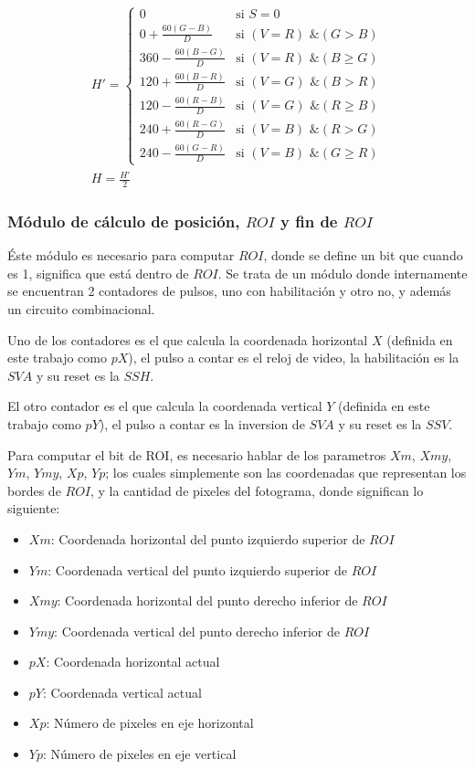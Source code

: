 \documentclass[twoside,spanish,ESP,MSc]{plantillaLabUPV}
\theoremstyle{definition}
\begin{document}
\begin{equation}\label{eqhent}
\begin{gathered}
{ H' = \left \{ \begin{matrix}
	0 & \mbox {si } S=0 \\ 
	0 + \frac{60(G-B)}{D}			& \mbox{si }(V=R) \mbox{ \& } (G > B) \\
	360 - \frac{60(B-G)}{D}			& \mbox{si }(V=R) \mbox{ \& } (B \geq G) \\
	120 + \frac{60(B-R)}{D}			& \mbox{si }(V=G) \mbox{ \& } (B > R) \\
	120 - \frac{60(R-B)}{D}			& \mbox{si }(V=G) \mbox{ \& } (R \geq B) \\
	240 + \frac{60(R-G)}{D}			& \mbox{si }(V=B) \mbox{ \& } (R > G) \\
	240 - \frac{60(G-R)}{D}			& \mbox{si }(V=B) \mbox{ \& } (G \geq R) 
	\end{matrix}\right. } \\
	H = \frac{H'}{2}
\end{gathered}
\end{equation}

\subsubsection{Módulo de cálculo de posición, $ROI$ y fin de $ROI$}
Éste módulo es necesario para computar $ROI$, donde se define un bit que cuando es 1, significa que está dentro de $ROI$. Se trata de un módulo donde internamente se encuentran 2 contadores de pulsos, uno con habilitación y otro no, y además un circuito combinacional.

Uno de los contadores es el que calcula la coordenada horizontal $X$ (definida en este trabajo como $pX$), el pulso a contar es el reloj de video, la habilitación es la $SVA$ y su reset es la $SSH$.

El otro contador es el que calcula la coordenada vertical $Y$ (definida en este trabajo como $pY$), el pulso a contar es la inversion de $SVA$ y su reset es la $SSV$.

Para computar el bit de ROI, es necesario hablar de los parametros $Xm$, $Xmy$, $Ym$, $Ymy$, $Xp$, $Yp$;  los cuales simplemente son las coordenadas que representan los bordes de $ROI$, y la cantidad de pixeles del fotograma, donde significan lo siguiente:

\begin{itemize}[noitemsep]
\item $Xm$: Coordenada horizontal del punto izquierdo superior de $ROI$
\item $Ym$: Coordenada vertical del punto izquierdo superior de $ROI$
\item $Xmy$: Coordenada horizontal del punto derecho inferior de $ROI$
\item $Ymy$: Coordenada vertical del punto derecho inferior de $ROI$
\item $pX$: Coordenada horizontal actual
\item $pY$: Coordenada vertical actual
\item $Xp$: Número de pixeles en eje horizontal
\item $Yp$: Número de pixeles en eje vertical 
\end{itemize}
\end{document}

